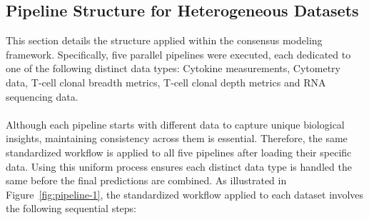 \documentclass[12pt,a4paper]{report}
\begin{document}
\subsection{Pipeline Structure for Heterogeneous Datasets}
\noindent
This section details the structure applied within the consensus modeling framework. Specifically, five parallel pipelines were executed, each dedicated to one of the following distinct data types:
Cytokine measurements, Cytometry data, T-cell clonal breadth metrics, T-cell clonal depth metrics and RNA sequencing data.\\
\\
Although each pipeline starts with different data to capture unique biological insights, maintaining consistency across them is essential. Therefore, the same standardized workflow is applied to all five pipelines after loading their specific data. Using this uniform process ensures each distinct data type is handled the same before the final predictions are combined. As illustrated in Figure~\ref{fig:pipeline-1}, the standardized workflow applied to each dataset involves the following sequential steps:
\end{document}

